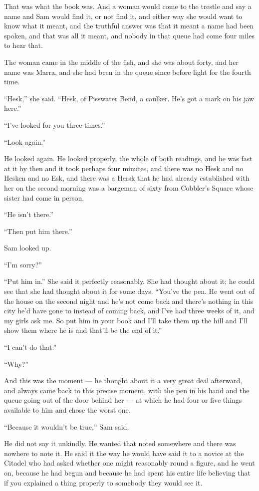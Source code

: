 That was what the book was. And a woman would come to the trestle and say a name and Sam would find it, or not find it, and either way she would want to know what it meant, and the truthful answer was that it meant a name had been spoken, and that was all it meant, and nobody in that queue had come four miles to hear that.

\sceneBreak

The woman came in the middle of the fish, and she was about forty, and her name was Marra, and she had been in the queue since before light for the fourth time.

“Hesk,” she said. “Hesk, of Pisswater Bend, a caulker. He’s got a mark on his jaw here.”

“I’ve looked for you three times.”

“Look again.”

He looked again. He looked properly, the whole of both readings, and he was fast at it by then and it took perhaps four minutes, and there was no Hesk and no Hesken and no Esk, and there was a Hersk that he had already established with her on the second morning was a bargeman of sixty from Cobbler’s Square whose sister had come in person.

“He isn’t there.”

“Then put him there.”

Sam looked up.

“I’m sorry?”

“Put him in.” She said it perfectly reasonably. She had thought about it; he could see that she had thought about it for some days. “You’ve the pen. He went out of the house on the second night and he’s not come back and there’s nothing in this city he’d have gone to instead of coming back, and I’ve had three weeks of it, and my girls ask me. So put him in your book and I’ll take them up the hill and I’ll show them where he is and that’ll be the end of it.”

“I can’t do that.”

“Why?”

And this was the moment — he thought about it a very great deal afterward, and always came back to this precise moment, with the pen in his hand and the queue going out of the door behind her — at which he had four or five things available to him and chose the worst one.

“Because it wouldn’t be true,” Sam said.

\sceneBreak

He did not say it unkindly. He wanted that noted somewhere and there was nowhere to note it. He said it the way he would have said it to a novice at the Citadel who had asked whether one might reasonably round a figure, and he went on, because he had begun and because he had spent his entire life believing that if you explained a thing properly to somebody they would see it.

